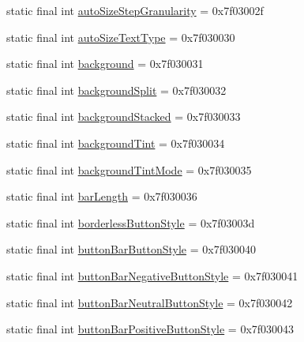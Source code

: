 \begin{DoxyCompactItemize}
\item 
static final int \mbox{\hyperlink{classandroid_1_1support_1_1v7_1_1appcompat_1_1R_1_1attr_a9842951e4e0a0f506950d576ed91a6bc}{auto\+Size\+Step\+Granularity}} = 0x7f03002f
\item 
static final int \mbox{\hyperlink{classandroid_1_1support_1_1v7_1_1appcompat_1_1R_1_1attr_a88e73eda0da576f10347ce50b6cf169e}{auto\+Size\+Text\+Type}} = 0x7f030030
\item 
static final int \mbox{\hyperlink{classandroid_1_1support_1_1v7_1_1appcompat_1_1R_1_1attr_aa34b0a503c23c24f0398d3e089ef275d}{background}} = 0x7f030031
\item 
static final int \mbox{\hyperlink{classandroid_1_1support_1_1v7_1_1appcompat_1_1R_1_1attr_ab1185b7b5fef8f7fda8589c4b5b6ae79}{background\+Split}} = 0x7f030032
\item 
static final int \mbox{\hyperlink{classandroid_1_1support_1_1v7_1_1appcompat_1_1R_1_1attr_a422ecdbfe92076c90e055fcef81e6844}{background\+Stacked}} = 0x7f030033
\item 
static final int \mbox{\hyperlink{classandroid_1_1support_1_1v7_1_1appcompat_1_1R_1_1attr_ac0cf5b18c785e17faa7ed5d7278a40d3}{background\+Tint}} = 0x7f030034
\item 
static final int \mbox{\hyperlink{classandroid_1_1support_1_1v7_1_1appcompat_1_1R_1_1attr_a2f1e8050f64f463eb7cb319d9bf59a54}{background\+Tint\+Mode}} = 0x7f030035
\item 
static final int \mbox{\hyperlink{classandroid_1_1support_1_1v7_1_1appcompat_1_1R_1_1attr_a68d79d306e3761cc1e98d20b818257e6}{bar\+Length}} = 0x7f030036
\item 
static final int \mbox{\hyperlink{classandroid_1_1support_1_1v7_1_1appcompat_1_1R_1_1attr_ab831f8a19b2d8d4f77c6c3ceccdc96b2}{borderless\+Button\+Style}} = 0x7f03003d
\item 
static final int \mbox{\hyperlink{classandroid_1_1support_1_1v7_1_1appcompat_1_1R_1_1attr_aa196f9cbf296cc7813680d2dd4bd85ce}{button\+Bar\+Button\+Style}} = 0x7f030040
\item 
static final int \mbox{\hyperlink{classandroid_1_1support_1_1v7_1_1appcompat_1_1R_1_1attr_aea5f5215fb29dd4730bf506287ee747f}{button\+Bar\+Negative\+Button\+Style}} = 0x7f030041
\item 
static final int \mbox{\hyperlink{classandroid_1_1support_1_1v7_1_1appcompat_1_1R_1_1attr_a49c37663655fddb580c3b76e322d41ef}{button\+Bar\+Neutral\+Button\+Style}} = 0x7f030042
\item 
static final int \mbox{\hyperlink{classandroid_1_1support_1_1v7_1_1appcompat_1_1R_1_1attr_a26cd7b024644bde342832500dee80fd4}{button\+Bar\+Positive\+Button\+Style}} = 0x7f030043

\end{DoxyCompactItemize}
